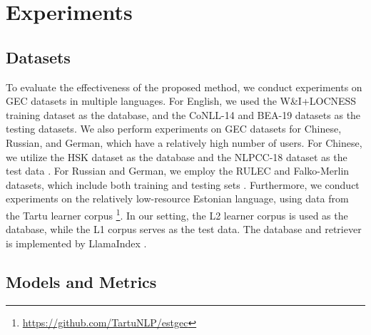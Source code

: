 \section{Experiments}






\subsection{Datasets}
\label{sec:datasets}
To evaluate the effectiveness of the proposed method, we conduct experiments on GEC datasets in multiple languages. For English, we used the W\&I+LOCNESS \cite{bryant-etal-2019-bea-19} training dataset as the database, and the CoNLL-14 \cite{ng-etal-2014-conll14} and BEA-19 datasets as the testing datasets. We also perform experiments on GEC datasets for Chinese, Russian, and German, which have a relatively high number of users. For Chinese, we utilize the HSK dataset \cite{zhang2009hsk} as the database and the NLPCC-18 dataset as the test data \cite{zhao2018nlpcc-gec}. For Russian and German, we employ the RULEC and Falko-Merlin datasets, which include both training and testing sets \cite{Rozovskaya-rulec, boyd-2018-falko_merlin}. Furthermore, we conduct experiments on the relatively low-resource Estonian language, using data from the Tartu learner corpus \footnote{\href{https://github.com/TartuNLP/estgec}{https://github.com/TartuNLP/estgec}}. In our setting, the L2 learner corpus is used as the database, while the L1 corpus serves as the test data. The database and retriever is implemented by LlamaIndex \cite{Liu_LlamaIndex_2022}.

\subsection{Models and Metrics}
\label{sec:model-metric}



